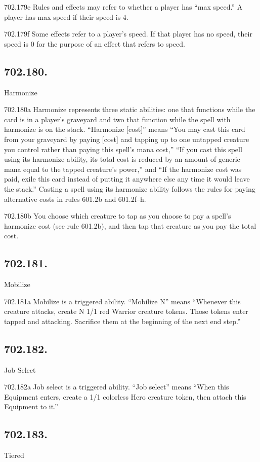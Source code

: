 702.179e Rules and effects may refer to whether a player has “max speed.” A player has max speed if their speed is 4.

702.179f Some effects refer to a player’s speed. If that player has no speed, their speed is 0 for the purpose of an effect that refers to speed.

\subsection*{702.180.}
Harmonize

702.180a Harmonize represents three static abilities: one that functions while the card is in a player’s graveyard and two that function while the spell with harmonize is on the stack. “Harmonize [cost]” means “You may cast this card from your graveyard by paying [cost] and tapping up to one untapped creature you control rather than paying this spell’s mana cost,” “If you cast this spell using its harmonize ability, its total cost is reduced by an amount of generic mana equal to the tapped creature’s power,” and “If the harmonize cost was paid, exile this card instead of putting it anywhere else any time it would leave the stack.” Casting a spell using its harmonize ability follows the rules for paying alternative costs in rules 601.2b and 601.2f–h.

702.180b You choose which creature to tap as you choose to pay a spell’s harmonize cost (see rule 601.2b), and then tap that creature as you pay the total cost.

\subsection*{702.181.}
Mobilize

702.181a Mobilize is a triggered ability. “Mobilize N” means “Whenever this creature attacks, create N 1/1 red Warrior creature tokens. Those tokens enter tapped and attacking. Sacrifice them at the beginning of the next end step.”

\subsection*{702.182.}
Job Select

702.182a Job select is a triggered ability. “Job select” means “When this Equipment enters, create a 1/1 colorless Hero creature token, then attach this Equipment to it.”

\subsection*{702.183.}
Tiered


